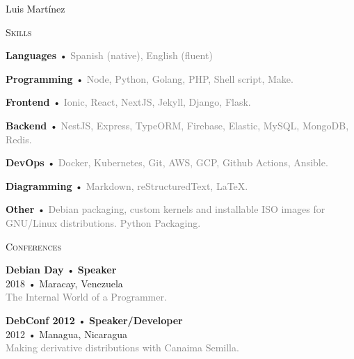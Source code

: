 \documentclass[12pt]{article}
\begin{document}
\begin{cv}{Luis Mart\'inez}
\begin{minipage}[t]{0.35\textwidth}
    \vspace{0.25em}
    \begin{minipage}{\linewidth}
      \textrm{\textsc{\Large{Skills}}}
      \newline
      \parbox[t]{\linewidth}{
        \textbf{Languages} • \footnotesize{\textcolor{gray}{Spanish (native), English (fluent)}}
      }
      \parbox[t]{\linewidth}{
        \textbf{Programming} • \footnotesize{\textcolor{gray}{Node, Python, Golang, PHP, Shell script, Make.}}
      }
      \parbox[t]{\linewidth}{
        \textbf{Frontend} • \footnotesize{\textcolor{gray}{Ionic, React, NextJS, Jekyll, Django, Flask.}}
      }
      \parbox[t]{\linewidth}{
        \textbf{Backend} • \footnotesize{\textcolor{gray}{NestJS, Express, TypeORM, Firebase, Elastic, MySQL, MongoDB, Redis.}}
      }
      \parbox[t]{\linewidth}{
        \textbf{DevOps} • \footnotesize{\textcolor{gray}{Docker, Kubernetes, Git, AWS, GCP, Github Actions, Ansible.}}
      }
      \parbox[t]{\linewidth}{
        \textbf{Diagramming} • \footnotesize{\textcolor{gray}{Markdown, reStructuredText, \LaTeX.}}
      }
      \parbox[t]{\linewidth}{
        \textbf{Other} • \footnotesize{\textcolor{gray}{Debian packaging, custom kernels and installable ISO images for GNU/Linux distributions. Python Packaging.}}
      }
      \newline
      \newline
    \end{minipage}

    \vspace{0.25em}
    \begin{minipage}{\linewidth}
      \textrm{\textsc{\Large{Conferences}}}
      \newline
      \parbox[t]{\linewidth}{
        \textbf{Debian Day} • \textrm{\textbf{Speaker}}\\
        2018 • Maracay, Venezuela\\
        \footnotesize{\textcolor{gray}{The Internal World of a Programmer.}}\\
      }
      \newline
      \parbox[t]{\linewidth}{
        \textbf{DebConf 2012} • \textrm{\textbf{Speaker/Developer}}\\
        2012 • Managua, Nicaragua\\
        \footnotesize{\textcolor{gray}{Making derivative distributions with Canaima Semilla.}}\\
      }
      \newline
    \end{minipage}


\end{minipage}
\end{cv}
\end{document}
